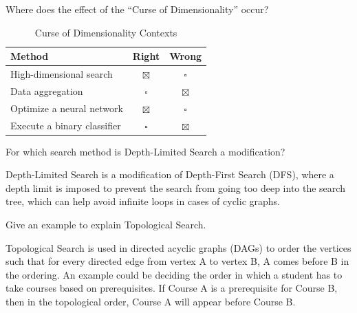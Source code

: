 \documentclass[12pt]{article}
\begin{document}
    \begin{ejercicio}
        Where does the effect of the ``Curse of Dimensionality'' occur?

        \begin{table}[h!]
        \centering
        \begin{tabular}{lcc}
        \hline
        \textbf{Method} & \textbf{Right} & \textbf{Wrong} \\ \hline
        High-dimensional search & $\boxtimes$ & $\square$ \\
        Data aggregation & $\square$ & $\boxtimes$ \\
        Optimize a neural network & $\boxtimes$ & $\square$ \\
        Execute a binary classifier & $\square$ & $\boxtimes$ \\ \hline
        \end{tabular}
        \caption{Curse of Dimensionality Contexts}
        \label{tab:curse_dimensionality2}
        \end{table}
    \end{ejercicio}

    \begin{ejercicio}
        For which search method is Depth-Limited Search a modification?

        Depth-Limited Search is a modification of Depth-First Search (DFS), where a depth limit is imposed to prevent the search from going too deep into the search tree, which can help avoid infinite loops in cases of cyclic graphs.
    \end{ejercicio}

    \begin{ejercicio}
        Give an example to explain Topological Search.

        Topological Search is used in directed acyclic graphs (DAGs) to order the vertices such that for every directed edge from vertex A to vertex B, A comes before B in the ordering. An example could be deciding the order in which a student has to take courses based on prerequisites. If Course A is a prerequisite for Course B, then in the topological order, Course A will appear before Course B.
    \end{ejercicio}
\end{document}
